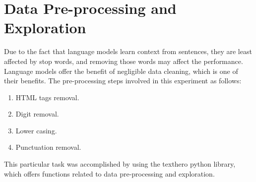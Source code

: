 \documentclass[%
	BCOR=8mm, %
	DIV=12,
	toc=bibliography, %
	toc=listof, %
	oneside, %
	egregdoesnotlikesansseriftitles, %
	]{scrbook}
\begin{document}
\section{Data Pre-processing and Exploration}
\label{section:datapreproc}
Due to the fact that language models learn context from sentences, they are least affected by stop words, and removing those words may affect the performance. Language models offer the benefit of negligible data cleaning, which is one of their benefits. The pre-processing steps involved in this experiment as follows:
\begin{enumerate}
\item  HTML tags removal.
\item Digit removal.
\item Lower casing.
\item  Punctuation removal.
\end{enumerate}
This particular task was accomplished by using the texthero python library, which offers functions related to data pre-processing and exploration.
\end{document}
